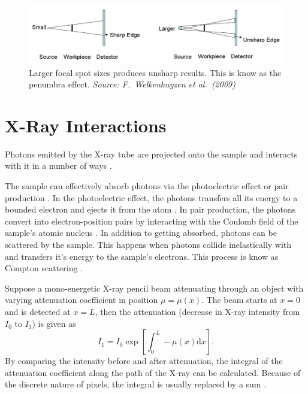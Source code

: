 \documentclass[12pt]{report}
\newcommand{\diff}{\mathrm{d}}
\begin{document}
\begin{figure}
\centering
\includegraphics[width=1\textwidth]{figures/x_ray_penumbra.png}
\caption{Larger focal spot sizes produces unsharp results. This is know as the penumbra effect. \emph{Source: F.~Welkenhuyzen et al.~(2009)\cite{welkenhuyzen2009industrial}}}
\label{fig:x_ray_penumbra}
\end{figure}

\section{X-Ray Interactions}
Photons emitted by the X-ray tube are projected onto the sample and interacts with it in a number of ways \cite{cantatore2011introduction}.

The sample can effectively absorb photons via the photoelectric effect or pair production \cite{cantatore2011introduction}. In the photoelectric effect, the photons transfers all its energy to a bounded electron and ejects it from the atom \cite{millikan1916direct}. In pair production, the photons convert into electron-position pairs by interacting with the Coulomb field of the sample's atomic nucleus \cite{hubbell2006electron}. In addition to getting absorbed, photons can be scattered by the sample. This happens when photons collide inelastically with and transfers it's energy to the sample's electrons. This process is know as Compton scattering \cite{compton1923quantum}.

Suppose a mono-energetic X-ray pencil beam attenuating through an object with varying attenuation coefficient in position $\mu=\mu(x)$. The beam starts at $x=0$ and is detected at $x=L$, then the attenuation (decrease in X-ray intensity from $I_0$ to $I_1$) is given as \cite{cantatore2011introduction}
\begin{equation}
I_1 = I_0\exp\left[\int_0^L-\mu(x)\diff x\right].
\label{eq:beerLaw}
\end{equation}
By comparing the intensity before and after attenuation, the integral of the attenuation coefficient along the path of the X-ray can be calculated. Because of the discrete nature of pixels, the integral is usually replaced by a sum \cite{michael2001x}. 
\end{document}
